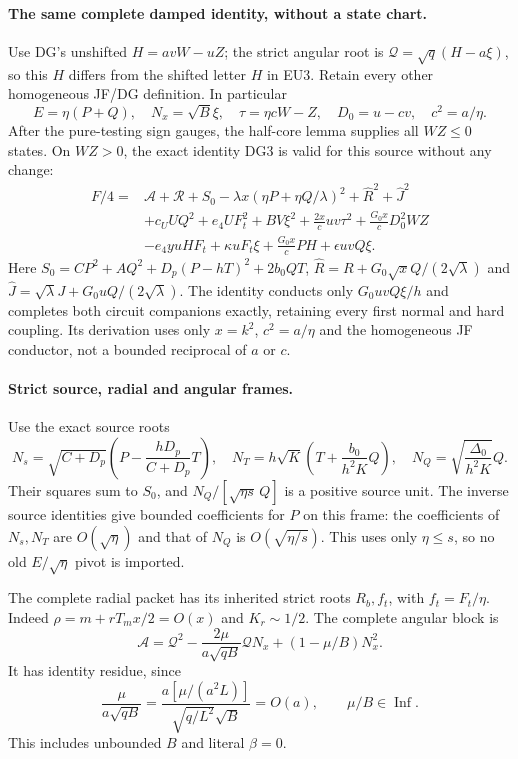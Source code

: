 \paragraph{The same complete damped identity, without a state chart.}
Use DG's unshifted $H=avW-uZ$; the strict angular root is
$\mathcal Q=\sqrt q(H-a\xi)$, so this $H$ differs from the
shifted letter $H$ in EU3. Retain every other homogeneous JF/DG
definition. In particular
\[
 E=\eta(P+Q),\quad N_x=\sqrt B\xi,\quad
 \tau=\eta cW-Z,\quad D_0=u-cv,\quad c^2=a/\eta.
\]
After the pure-testing sign gauges, the half-core lemma supplies all
$WZ\le0$ states. On $WZ>0$, the exact identity DG3 is valid for
this source without any change:
\[
\begin{split}
 F/4={}&\mathscr A+\mathscr R+S_0
       -\lambda x(\eta P+\eta Q/\lambda)^2
       +\widehat R^2+\widehat J^2\\
 &+c_UUQ^2+e_4UF_t^2+BV\xi^2
       +\frac{2x}{c}uv\tau^2+\frac{G_0x}{c}D_0^2WZ\\
 &-e_4yuHF_t+\kappa uF_t\xi
       +\frac{G_0x}{c}PH+\epsilon uvQ\xi.             
\end{split}\tag{LD9}
\]
Here $S_0=CP^2+AQ^2+D_p(P-hT)^2+2b_0QT$,
$\widehat R=R+G_0\sqrt xQ/(2\sqrt\lambda)$ and
$\widehat J=\sqrt\lambda J+G_0uQ/(2\sqrt\lambda)$.
The identity conducts only $G_0uvQ\xi/h$ and completes both
circuit companions exactly, retaining every first normal and hard
coupling. Its derivation uses only $x=k^2$, $c^2=a/\eta$ and the
homogeneous JF conductor, not a bounded reciprocal of $a$ or $c$.

\paragraph{Strict source, radial and angular frames.}
Use the exact source roots
\[
 N_s=\sqrt{C+D_p}\left(P-\frac{hD_p}{C+D_p}T\right),
 \quad N_T=h\sqrt K\left(T+\frac{b_0}{h^2K}Q\right),
 \quad N_Q=\sqrt{\frac{\Delta_0}{h^2K}}Q.            \tag{LD10}
\]
Their squares sum to $S_0$, and
$N_Q/[\sqrt{\eta s}\,Q]$ is a positive source unit.
The inverse source identities give bounded coefficients for $P$
on this frame: the coefficients of $N_s,N_T$ are $O(\sqrt\eta)$
and that of $N_Q$ is $O(\sqrt{\eta/s})$. This uses only
$\eta\le s$, so no old $E/\sqrt\eta$ pivot is imported.

The complete radial packet has its inherited strict roots $R_b,f_t$,
with $f_t=F_t/\eta$. Indeed $\rho=m+rT_mx/2=O(x)$ and
$K_r\sim1/2$. The complete angular block is
\[
 \mathscr A=\mathcal Q^2-
       \frac{2\mu}{a\sqrt{qB}}\mathcal QN_x
                  +(1-\mu/B)N_x^2.
\]
It has identity residue, since
\[
 \frac{\mu}{a\sqrt{qB}}
       =\frac{a[\mu/(a^2L)]}{\sqrt{q/L^2}\sqrt B}=O(a),
 \qquad\mu/B\in\operatorname{Inf}.                 \tag{LD11}
\]
This includes unbounded $B$ and literal $\beta=0$.

